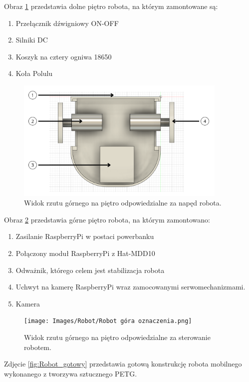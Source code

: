 \documentclass[a4paper,twoside,12pt]{book}
\begin{document}
\newpage
Obraz \ref{fig:Robot dół} przedstawia dolne piętro robota, na którym zamontowane są:
\begin{enumerate}
    \item Przełącznik dźwigniowy ON-OFF
    \item Silniki DC
    \item Koszyk na cztery ogniwa 18650
    \item Koła Polulu
\end{enumerate}
\begin{figure}[h]
    \centering
    \includegraphics[width=0.9\textwidth]{Images/Robot/Robot dół oznaczenia.png}
    \caption{Widok rzutu górnego na piętro odpowiedzialne za napęd robota.}
    \label{fig:Robot dół}
\end{figure}
\newpage
Obraz \ref{fig:Robot góra} przedstawia górne piętro robota, na którym zamontowano:
\begin{enumerate}
    \item Zasilanie RaspberryPi w postaci powerbanku
    \item Połączony moduł RaspberryPi z Hat-MDD10
    \item Odważnik, którego celem jest stabilizacja robota
    \item Uchwyt na kamerę RaspberryPi wraz zamocowanymi serwomechanizmami.
    \item Kamera
\end{enumerate}
\begin{figure}[h]
    \centering
    \texttt{[image: Images/Robot/Robot góra oznaczenia.png]}
    \caption{Widok rzutu górnego na piętro odpowiedzialne za sterowanie robotem.}
    \label{fig:Robot góra}
\end{figure}
\newpage
Zdjęcie \ref{fig:Robot_gotowy} przedstawia gotową konstrukcję robota mobilnego wykonanego z tworzywa sztucznego PETG. 
\end{document}
